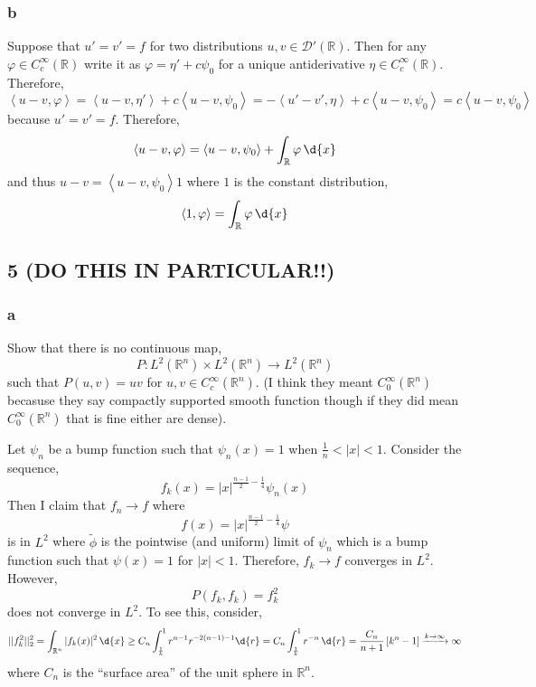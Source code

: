 \documentclass[12pt]{article}
\newcommand{\inner}[2]{\left< #1, #2 \right>}
\newcommand{\R}{\mathbb{R}}
\renewcommand{\D}{\mathcal{D}}
\begin{document}
\subsubsection{b}

Suppose that $u' = v' = f$ for two distributions $u,v \in \D'(\R)$. Then for any $\varphi \in C^\infty_c(\R)$ write it as $\varphi = \eta' + c \psi_0$ for a unique antiderivative $\eta \in C^\infty_c(\R)$. Therefore,
\[ \inner{u - v}{\varphi} = \inner{u - v}{\eta'} + c \inner{u - v}{\psi_0} = - \inner{u' - v'}{\eta} + c \inner{u - v}{\psi_0} = c \inner{u - v}{\psi_0} \]
because $u' = v' = f$. Therefore,
\[ \inner{u - v}{\varphi} = \inner{u - v}{\psi_0} + \int_\R \varphi \, \d{x} \]
and thus $u - v = \inner{u - v}{\psi_0} 1$ where $1$ is the constant distribution,
\[ \inner{1}{\varphi} = \int_\R \varphi \, \d{x} \]

\subsection{5 (DO THIS IN PARTICULAR!!)}

\subsubsection{a}

\begin{exercise}
Show that there is no continuous map,
\[ P : L^2(\R^n) \times L^2(\R^n) \to L^2(\R^n) \]
such that $P(u,v) = uv$ for $u, v \in C^\infty_c(\R^n)$. (I think they meant $C^\infty_0(\R^n)$ becasuse they say compactly supported smooth function though if they did mean $C^\infty_0(\R^n)$ that is fine either are dense).
\end{exercise}

Let $\psi_n$ be a bump function such that $\psi_n(x) = 1$ when $\frac{1}{n} < |x| < 1$.
Consider the sequence,
\[ f_k(x) = |x|^{\frac{n-1}{2}-\frac{1}{4}} \psi_{n}(x) \]
Then I claim that $f_n \to f$ where 
\[ f(x) = |x|^{\frac{n-1}{2}-\frac{1}{4}} \psi \]
 is in $L^2$ where $\tilde{\phi}$ is the pointwise (and uniform) limit of $\psi_n$ which is a bump function such that $\psi(x) = 1$ for $|x| < 1$. Therefore, $f_k \to f$ converges in $L^2$. However,
\[ P(f_k, f_k) = f_k^2 \]
does not converge in $L^2$. To see this, consider,
\[ || f_k^2 ||^2_2 = \int_{\R^n} |f_k(x)|^2 \, \d{x} \ge C_n \int_{\frac{1}{k}}^1 r^{n-1} r^{-2(n-1) - 1} \d{r} = C_n \int_{\frac{1}{k}}^1 r^{-n} \, \d{r} = \frac{C_n}{n+1} \left[ k^n - 1 \right] \xrightarrow{k \to \infty} \infty \] 
where $C_n$ is the ``surface area'' of the unit sphere in $\R^n$.
\end{document}
